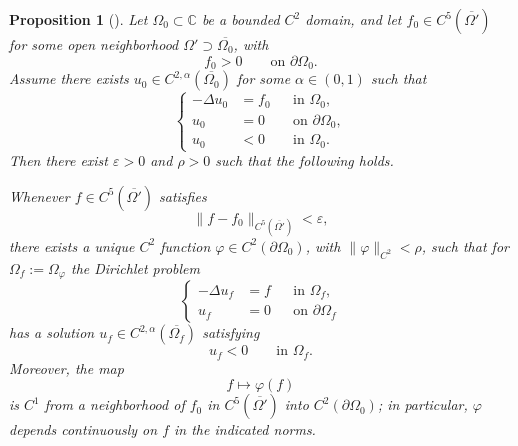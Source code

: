 \documentclass[a4paper,11pt,reqno]{amsart}
\numberwithin{equation}{section}
\theoremstyle{plain} %
\newtheorem{proposition}{Proposition}[section]
\theoremstyle{definition} %
\theoremstyle{remark}
\newcommand{\C}{\mathbb{C}}
\begin{document}
\begin{proposition}[\cite{Isakov}] \label{prop:isakov-tailored}
Let \(\Omega_0\subset \C\) be a bounded \(C^2\) domain, and let
\(f_0\in C^5(\overline{\Omega'})\) for some open neighborhood
\(\Omega'\supset \overline{\Omega_0}\), with
\[
f_0>0 \qquad \text{on } \partial\Omega_0.
\]
Assume there exists \(u_0\in C^{2,\alpha}(\overline{\Omega_0})\) for some
\(\alpha\in(0,1)\) such that
\begin{equation}\label{eq:appendix-reference-problem}
\left\{
\begin{aligned}
-\Delta u_0 &= f_0 &&\text{in }\Omega_0,\\
u_0&=0 &&\text{on }\partial\Omega_0,\\
u_0&<0 &&\text{in }\Omega_0.
\end{aligned}
\right.
\end{equation}
Then there exist \(\varepsilon>0\) and \(\rho>0\) such that the following holds.

Whenever \(f\in C^5(\overline{\Omega'})\) satisfies
\[
\|f-f_0\|_{C^5(\overline{\Omega'})}<\varepsilon,
\]
there exists a unique \(C^2\) function
\(\varphi\in C^2(\partial\Omega_0)\), with \(\|\varphi\|_{C^2}<\rho\), such that
for \(\Omega_f:=\Omega_\varphi\) the Dirichlet problem
\begin{equation}\label{eq:appendix-perturbed-problem}
\left\{
\begin{aligned}
-\Delta u_f &= f &&\text{in }\Omega_f,\\
u_f&=0 &&\text{on }\partial\Omega_f
\end{aligned}
\right.
\end{equation}
has a solution \(u_f\in C^{2,\alpha}(\overline{\Omega_f})\) satisfying
\[
u_f<0 \qquad \text{in }\Omega_f.
\]
Moreover, the map
\[
f\mapsto \varphi(f)
\]
is \(C^1\) from a neighborhood of \(f_0\) in \(C^5(\overline{\Omega'})\) into
\(C^2(\partial\Omega_0)\); in particular, \(\varphi\) depends continuously on
\(f\) in the indicated norms.
\end{proposition}
\end{document}
